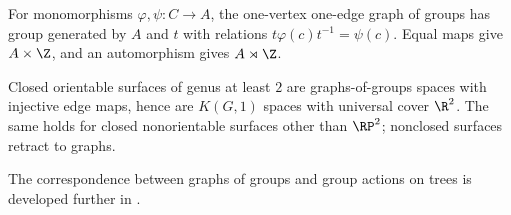 \begin{example}
\label{ex:hnn-extension}
For monomorphisms $\varphi,\psi:C\to A$, the one-vertex one-edge graph of
groups has group generated by $A$ and $t$ with relations
$t\varphi(c)t^{-1}=\psi(c)$. Equal maps give $A\times\Z$, and an automorphism
gives $A\rtimes\Z$.
\end{example}

\begin{example}
\label{ex:closed-surfaces-are-kg1}
Closed orientable surfaces of genus at least $2$ are graphs-of-groups spaces
with injective edge maps, hence are $K(G,1)$ spaces with universal cover
$\R^2$. The same holds for closed nonorientable surfaces other than $\RP^2$;
nonclosed surfaces retract to graphs.
\end{example}

The correspondence between graphs of groups and group actions on trees is
developed further in \cite{ScottWall1979}.

